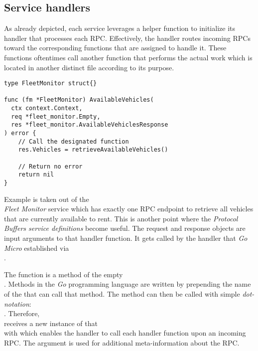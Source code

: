 \documentclass[12pt,a4paper,twoside]{report}
\begin{document}
\subsection{Service handlers} \label{subsect:service-handlers}

As already depicted, each service leverages a helper function to initialize
its handler that processes each RPC. Effectively, the handler routes incoming
RPCs toward the corresponding functions that are assigned to handle it.
These functions oftentimes call another function that performs the actual work
which is located in another distinct file according to its purpose.

\begin{lstlisting}[title=services/fleet-monitor/main.go, float, floatplacement=H]
type FleetMonitor struct{}

func (fm *FleetMonitor) AvailableVehicles(
  ctx context.Context,
  req *fleet_monitor.Empty,
  res *fleet_monitor.AvailableVehiclesResponse
) error {
    // Call the designated function
	res.Vehicles = retrieveAvailableVehicles()

    // Return no error
	return nil
}
\end{lstlisting}

Example  is taken out of the\\
\textit{Fleet Monitor} service which has exactly one RPC endpoint to retrieve
all vehicles that are currently available to rent.
This is another point where the \textit{Protocol Buffers service definitions}
become useful. The request and response objects are input arguments to that
handler function. It gets called by the handler that \textit{Go Micro} established via\\
.

The function  is a method of the empty\\
 . Methods in the \textit{Go} programming
language are written by prepending the name of the  that can
call that method. The method can then be called with simple \textit{dot-notation}:\\
.
Therefore, \\ receives a new instance of that\\
  with  which enables
the handler to call each handler function upon an incoming RPC.
The  argument is used for additional meta-information about the RPC.
\end{document}
